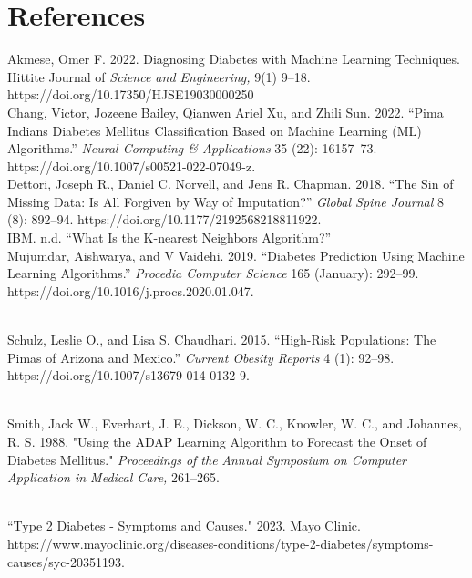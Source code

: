 \documentclass[journal]{IEEEtran}
\begin{document}
\section*{References}
Akmese, Omer F. 2022. Diagnosing Diabetes with Machine Learning Techniques. Hittite Journal of \textit{Science and Engineering,} 9(1) 9–18. https://doi.org/10.17350/HJSE19030000250\\

Chang, Victor, Jozeene Bailey, Qianwen Ariel Xu, and Zhili Sun. 2022. “Pima Indians Diabetes Mellitus Classification Based on Machine Learning (ML) Algorithms.” \textit{Neural Computing \& Applications} 35 (22): 16157–73. https://doi.org/10.1007/s00521-022-07049-z.\\

Dettori, Joseph R., Daniel C. Norvell, and Jens R. Chapman. 2018. “The Sin of Missing Data: Is All Forgiven by Way of Imputation?” \textit{Global Spine Journal} 8 (8): 892–94. https://doi.org/10.1177/2192568218811922.\\

IBM. n.d. “What Is the K-nearest Neighbors Algorithm?”\\

Mujumdar, Aishwarya, and V Vaidehi. 2019. “Diabetes Prediction Using Machine Learning Algorithms.” \textit{Procedia Computer Science} 165 (January): 292–99. https://doi.org/10.1016/j.procs.2020.01.047.\\
\

Schulz, Leslie O., and Lisa S. Chaudhari. 2015. “High-Risk Populations: The Pimas of Arizona and Mexico.” \textit{Current Obesity Reports} 4 (1): 92–98. https://doi.org/10.1007/s13679-014-0132-9.\\
\

Smith, Jack W., Everhart, J. E., Dickson, W. C., Knowler, W. C., and Johannes, R. S. 1988. "Using the ADAP Learning Algorithm to Forecast the Onset of Diabetes Mellitus." \textit{Proceedings of the} \textit{Annual Symposium on Computer Application in Medical Care,} 261–265.\\
\

“Type 2 Diabetes - Symptoms and Causes." 2023. Mayo Clinic. https://www.mayoclinic.org/diseases-conditions/type-2-diabetes/symptoms-causes/syc-20351193.\\


\ifCLASSOPTIONcaptionsoff
  \newpage

\fi


\end{document}
